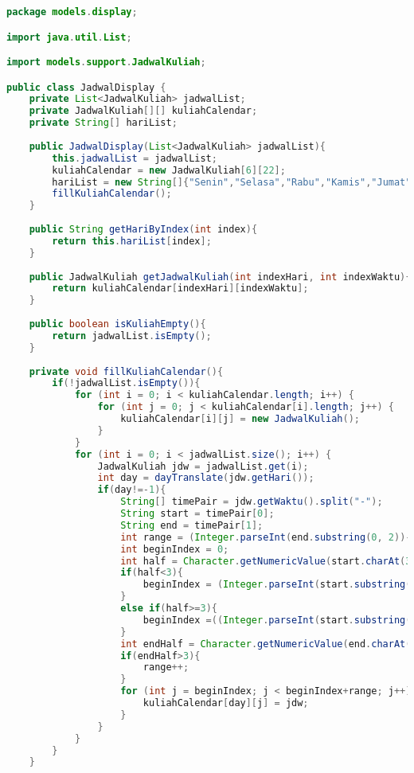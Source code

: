 \singlespacing 
\begin{lstlisting}[language=Java,basicstyle=\tiny,caption=JadwalDisplay.java]
	package models.display;

import java.util.List;

import models.support.JadwalKuliah;

public class JadwalDisplay {
	private List<JadwalKuliah> jadwalList;
	private JadwalKuliah[][] kuliahCalendar;
	private String[] hariList;
	
	public JadwalDisplay(List<JadwalKuliah> jadwalList){
		this.jadwalList = jadwalList;
		kuliahCalendar = new JadwalKuliah[6][22];
		hariList = new String[]{"Senin","Selasa","Rabu","Kamis","Jumat","Sabtu","Minggu"};
		fillKuliahCalendar();
	}
	
	public String getHariByIndex(int index){
		return this.hariList[index];
	}
	
	public JadwalKuliah getJadwalKuliah(int indexHari, int indexWaktu){
		return kuliahCalendar[indexHari][indexWaktu];
	}
	
	public boolean isKuliahEmpty(){
		return jadwalList.isEmpty();
	}
	
	private void fillKuliahCalendar(){
		if(!jadwalList.isEmpty()){
            for (int i = 0; i < kuliahCalendar.length; i++) {
                for (int j = 0; j < kuliahCalendar[i].length; j++) {
                    kuliahCalendar[i][j] = new JadwalKuliah();
                }
            }
            for (int i = 0; i < jadwalList.size(); i++) {
                JadwalKuliah jdw = jadwalList.get(i);
                int day = dayTranslate(jdw.getHari());
                if(day!=-1){
                	String[] timePair = jdw.getWaktu().split("-");
                    String start = timePair[0];
                    String end = timePair[1];
                    int range = (Integer.parseInt(end.substring(0, 2))- Integer.parseInt(start.substring(0, 2)))*2;
                    int beginIndex = 0;
                    int half = Character.getNumericValue(start.charAt(3));
                    if(half<3){
                        beginIndex = (Integer.parseInt(start.substring(0, 2))-7)*2;
                    }
                    else if(half>=3){
                        beginIndex =((Integer.parseInt(start.substring(0, 2))-7)*2)+1;
                    }
                    int endHalf = Character.getNumericValue(end.charAt(3));
                    if(endHalf>3){
                    	range++;  
                    }
                    for (int j = beginIndex; j < beginIndex+range; j++) {
                    	kuliahCalendar[day][j] = jdw;      	
                    }
                }
            }
        }
	}
	

\end{lstlisting}
